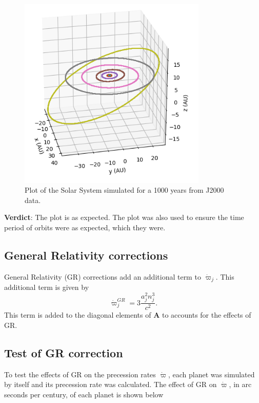\documentclass[11pt, oneside]{article}   	%
\begin{document}
\begin{figure}[!h]
\begin{center}
\includegraphics[width= 0.8\textwidth]{SolarSystem3D_rsz}
\caption[]{Plot of the Solar System simulated for a 1000 years from J2000 data.}
\label{}
\end{center}
\end{figure}

\textbf{Verdict}: The plot is as expected. The plot was also used to ensure the time period of orbits were as expected, which they were.

\subsection{General Relativity corrections}

General Relativity (GR) corrections add an additional term to $\dot{\varpi}_{j}$. This additional term is given by \cite{Adams2006}
\begin{equation}
\dot{\varpi}_{j}^{GR} = 3\frac{a_{j}^{2}n_{j}^{3}}{c^{2}}.
\end{equation}
This term is added to the diagonal elements of $\mathbf{A}$ to accounts for the effects of GR.

\subsection{Test of GR correction}

To test the effects of GR on the precession rates $\dot{\varpi}$, each planet was simulated by itself and its precession rate was calculated. The effect of GR on $\dot{\varpi}$, in arc seconds per century, of each planet is shown below
\end{document}
